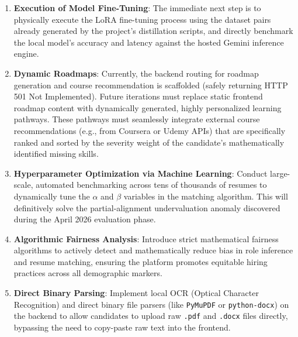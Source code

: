 \documentclass[12pt,a4paper]{report}
\begin{document}
\begin{enumerate}
    \item \textbf{Execution of Model Fine-Tuning}: The immediate next step is to physically execute the LoRA fine-tuning process using the dataset pairs already generated by the project's distillation scripts, and directly benchmark the local model's accuracy and latency against the hosted Gemini inference engine.
    \item \textbf{Dynamic Roadmaps}: Currently, the backend routing for roadmap generation and course recommendation is scaffolded (safely returning HTTP 501 Not Implemented). Future iterations must replace static frontend roadmap content with dynamically generated, highly personalized learning pathways. These pathways must seamlessly integrate external course recommendations (e.g., from Coursera or Udemy APIs) that are specifically ranked and sorted by the severity weight of the candidate's mathematically identified missing skills.
    \item \textbf{Hyperparameter Optimization via Machine Learning}: Conduct large-scale, automated benchmarking across tens of thousands of resumes to dynamically tune the $\alpha$ and $\beta$ variables in the matching algorithm. This will definitively solve the partial-alignment undervaluation anomaly discovered during the April 2026 evaluation phase.
    \item \textbf{Algorithmic Fairness Analysis}: Introduce strict mathematical fairness algorithms to actively detect and mathematically reduce bias in role inference and resume matching, ensuring the platform promotes equitable hiring practices across all demographic markers.
    \item \textbf{Direct Binary Parsing}: Implement local OCR (Optical Character Recognition) and direct binary file parsers (like \texttt{PyMuPDF} or \texttt{python-docx}) on the backend to allow candidates to upload raw \texttt{.pdf} and \texttt{.docx} files directly, bypassing the need to copy-paste raw text into the frontend.
\end{enumerate}
\end{document}

